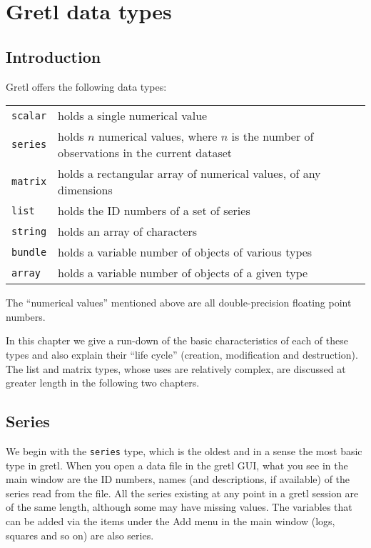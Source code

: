 \chapter{Gretl data types}
\label{chap:datatypes}

\section{Introduction}

Gretl offers the following data types:
%
\begin{center}
\begin{tabular}{lp{}}
\texttt{scalar} & holds a single numerical value\\
\texttt{series} & holds $n$ numerical values, where $n$
 is the number of observations in the current dataset \\
\texttt{matrix} & holds a rectangular array of numerical
 values, of any dimensions\\
\texttt{list} & holds the ID numbers of a set of series \\
\texttt{string} & holds an array of characters\\
\texttt{bundle} & holds a variable number of objects of 
 various types \\
\texttt{array} & holds a variable number of objects of 
 a given type
\end{tabular}
\end{center}

The ``numerical values'' mentioned above are all double-precision
floating point numbers.

In this chapter we give a run-down of the basic characteristics of
each of these types and also explain their ``life cycle'' (creation,
modification and destruction). The list and matrix types, whose uses
are relatively complex, are discussed at greater length in the
following two chapters. 

\section{Series}
\label{sec:Series}

We begin with the \texttt{series} type, which is the oldest and in a
sense the most basic type in gretl. When you open a data file in the
gretl GUI, what you see in the main window are the ID numbers, names
(and descriptions, if available) of the series read from the file. All
the series existing at any point in a gretl session are of the same
length, although some may have missing values. The variables that can
be added via the items under the \textsf{Add} menu in the main window
(logs, squares and so on) are also series.

